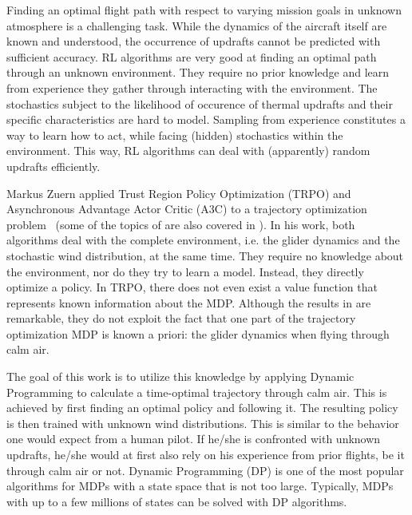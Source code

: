 Finding an optimal flight path with respect to varying mission goals in unknown atmosphere is a challenging task. While the dynamics of the aircraft itself are known and understood, the occurrence of updrafts cannot be predicted with sufficient accuracy. RL algorithms are very good at finding an optimal path through an unknown environment. They require no prior knowledge and learn from experience they gather through interacting with the environment. The stochastics subject to the likelihood of occurence of thermal updrafts and their specific characteristics are hard to model. Sampling from experience constitutes a way to learn how to act, while facing (hidden) stochastics within the environment. This way, RL algorithms can deal with (apparently) random updrafts efficiently.

Markus Zuern applied Trust Region Policy Optimization (TRPO) and Asynchronous Advantage Actor Critic (A3C) to a trajectory optimization problem~\cite{Zuern2017} (some of the topics of \cite{Zuern2017} are also covered in \cite{Notter2018}). In his work, both algorithms deal with the complete environment, i.e. the glider dynamics and the stochastic wind distribution, at the same time. They require no knowledge about the environment, nor do they try to learn a model. Instead, they directly optimize a policy. In TRPO, there does not even exist a value function that represents known information about the MDP. Although the results in \cite{Zuern2017} are remarkable, they do not exploit the fact that one part of the trajectory optimization MDP is known a priori: the glider dynamics when flying through calm air.

The goal of this work is to utilize this knowledge by applying Dynamic Programming to calculate a time-optimal trajectory through calm air. This is achieved by first finding an optimal policy and following it. The resulting policy is then trained with unknown wind distributions. This is similar to the behavior one would expect from a human pilot. If he/she is confronted with unknown updrafts, he/she would at first also rely on his experience from prior flights, be it through calm air or not. Dynamic Programming (DP) is one of the most popular algorithms for MDPs with a state space that is not too large. Typically, MDPs with up to a few millions of states can be solved with DP algorithms.

